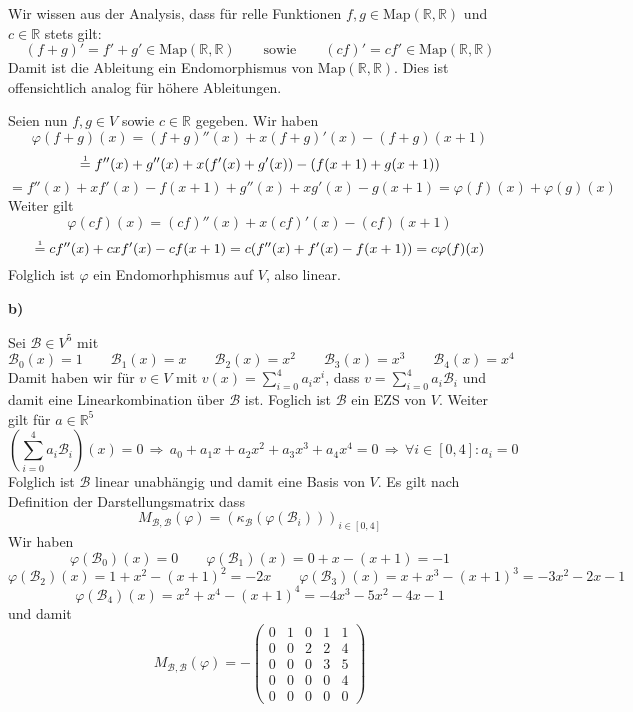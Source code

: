 \documentclass[a4paper,graphics,11pt]{article}
\newcommand{\up}[2]{\mathrel{\overset{\makebox[0pt]{\mbox{\normalfont\tiny #2}}}{#1}}}
\begin{document}
Wir wissen aus der Analysis, dass für relle Funktionen $f,g \in \text{Map}(\mathbb{R}, \mathbb{R})$ und $c \in \mathbb{R}$ stets gilt:
\begin{equation}
    (f+g)' = f'+g' \in \text{Map}(\mathbb{R}, \mathbb{R})
    \qquad\text{sowie}\qquad
    (cf)' = cf' \in \text{Map}(\mathbb{R}, \mathbb{R})
\end{equation}
Damit ist die Ableitung ein Endomorphismus von Map$(\mathbb{R}, \mathbb{R})$. Dies ist offensichtlich analog für höhere Ableitungen.

Seien nun $f,g \in V$ sowie $c \in \mathbb{R}$ gegeben. Wir haben
$$
    \varphi(f+g)(x)
    = (f+g)''(x) + x(f+g)'(x) - (f+g)(x+1)
$$$$
    \up{=}{1} f''(x) + g''(x) + x(f'(x)+g'(x)) - (f(x+1)+g(x+1))
$$$$
    = f''(x) + xf'(x) - f(x+1) + g''(x) +xg'(x) - g(x+1)
    = \varphi(f)(x) + \varphi(g)(x)
$$
Weiter gilt
$$
    \varphi(cf)(x)
    = (cf)''(x) + x(cf)'(x) - (cf)(x+1)
$$$$
    \up{=}{1} cf''(x) + cxf'(x) - cf(x+1)
    = c(f''(x)+f'(x)-f(x+1))
    = c\varphi(f)(x)
$$
Folglich ist $\varphi$ ein Endomorhphismus auf $V$, also linear.

\newpage

\textbf{b)}

Sei $\mathcal{B} \in V^5$ mit
$$
    \mathcal{B}_0(x) = 1
    \qquad
    \mathcal{B}_1(x) = x
    \qquad
    \mathcal{B}_2(x) = x^2
    \qquad
    \mathcal{B}_3(x) = x^3
    \qquad
    \mathcal{B}_4(x) = x^4
$$
Damit haben wir für $v \in V$ mit $v(x) = \sum_{i=0}^{4} a_ix^i$, dass $v = \sum_{i=0}^{4} a_i\mathcal{B}_i$
und damit eine Linearkombination über $\mathcal{B}$ ist. Foglich ist $\mathcal{B}$ ein EZS von $V$.
Weiter gilt für $a \in \mathbb{R}^5$
$$
    \left(\sum_{i=0}^{4} a_i\mathcal{B}_i\right)(x) = 0
    \,\Longrightarrow\, a_0 + a_1x + a_2x^2 + a_3x^3 + a_4x^4 = 0
    \,\Longrightarrow\, \forall i \in [0,4] : a_i = 0
$$
Folglich ist $\mathcal{B}$ linear unabhängig und damit eine Basis von $V$.
Es gilt nach Definition der Darstellungsmatrix dass
$$
    M_{\mathcal{B}, \mathcal{B}}(\varphi) = (\kappa_\mathcal{B}(\varphi(\mathcal{B}_i)))_{i \in [0,4]}
$$
Wir haben
$$
    \varphi(\mathcal{B}_0)(x) = 0
    \qquad
    \varphi(\mathcal{B}_1)(x) = 0 + x - (x+1) = -1
$$$$
    \varphi(\mathcal{B}_2)(x) = 1 + x^2 - (x+1)^2 = -2x
    \qquad
    \varphi(\mathcal{B}_3)(x) = x + x^3 - (x+1)^3 = -3x^2-2x-1
$$$$
    \varphi(\mathcal{B}_4)(x) = x^2 + x^4 - (x+1)^4 = -4x^3-5x^2-4x-1
$$
und damit
$$
    M_{\mathcal{B}, \mathcal{B}}(\varphi)
    = -\begin{pmatrix}
        0 & 1 & 0 & 1 & 1\\
        0 & 0 & 2 & 2 & 4\\
        0 & 0 & 0 & 3 & 5\\
        0 & 0 & 0 & 0 & 4\\
        0 & 0 & 0 & 0 & 0
    \end{pmatrix}
$$
\end{document}
